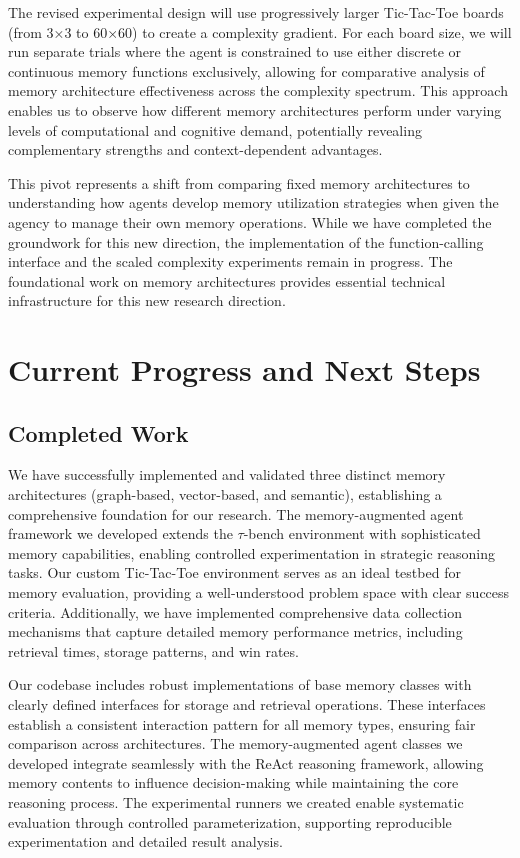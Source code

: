 \documentclass{article}
\begin{document}
The revised experimental design will use progressively larger Tic-Tac-Toe boards (from 3×3 to 60×60) to create a complexity gradient. For each board size, we will run separate trials where the agent is constrained to use either discrete or continuous memory functions exclusively, allowing for comparative analysis of memory architecture effectiveness across the complexity spectrum. This approach enables us to observe how different memory architectures perform under varying levels of computational and cognitive demand, potentially revealing complementary strengths and context-dependent advantages.

This pivot represents a shift from comparing fixed memory architectures to understanding how agents develop memory utilization strategies when given the agency to manage their own memory operations. While we have completed the groundwork for this new direction, the implementation of the function-calling interface and the scaled complexity experiments remain in progress. The foundational work on memory architectures provides essential technical infrastructure for this new research direction.

\section{Current Progress and Next Steps}

\subsection{Completed Work}

We have successfully implemented and validated three distinct memory architectures (graph-based, vector-based, and semantic), establishing a comprehensive foundation for our research. The memory-augmented agent framework we developed extends the $\tau$-bench environment with sophisticated memory capabilities, enabling controlled experimentation in strategic reasoning tasks. Our custom Tic-Tac-Toe environment serves as an ideal testbed for memory evaluation, providing a well-understood problem space with clear success criteria. Additionally, we have implemented comprehensive data collection mechanisms that capture detailed memory performance metrics, including retrieval times, storage patterns, and win rates.

Our codebase includes robust implementations of base memory classes with clearly defined interfaces for storage and retrieval operations. These interfaces establish a consistent interaction pattern for all memory types, ensuring fair comparison across architectures. The memory-augmented agent classes we developed integrate seamlessly with the ReAct reasoning framework, allowing memory contents to influence decision-making while maintaining the core reasoning process. The experimental runners we created enable systematic evaluation through controlled parameterization, supporting reproducible experimentation and detailed result analysis.
\end{document}
